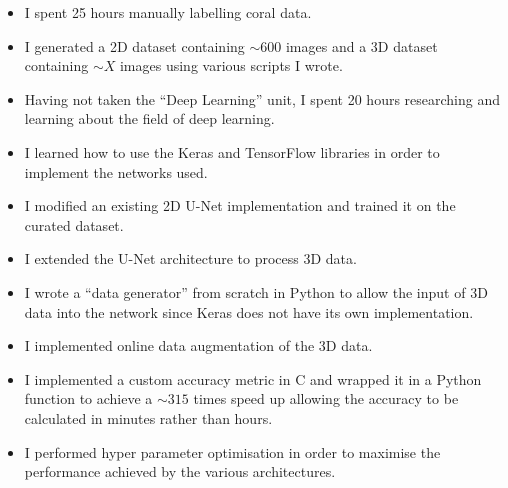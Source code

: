 \begin{itemize}
    \item I spent 25 hours manually labelling coral data.
    \item I generated a 2D dataset containing ${\sim}600$ images and a 3D dataset containing ${\sim}X$ images using various scripts I wrote.
    \item Having not taken the ``Deep Learning'' unit, I spent 20 hours researching and learning about the field of deep learning.
    \item I learned how to use the Keras and TensorFlow libraries in order to implement the networks used.
    \item I modified an existing 2D U-Net implementation and trained it on the curated dataset.
    \item I extended the U-Net architecture to process 3D data.
    \item I wrote a ``data generator'' from scratch in Python to allow the input of 3D data into the network since Keras does not have its own implementation.
    \item I implemented online data augmentation of the 3D data.
    \item I implemented a custom accuracy metric in C and wrapped it in a Python function to achieve a ${\sim}315$ times speed up allowing the accuracy to be calculated in minutes rather than hours.
    \item I performed hyper parameter optimisation in order to maximise the performance achieved by the various architectures.
\end{itemize}